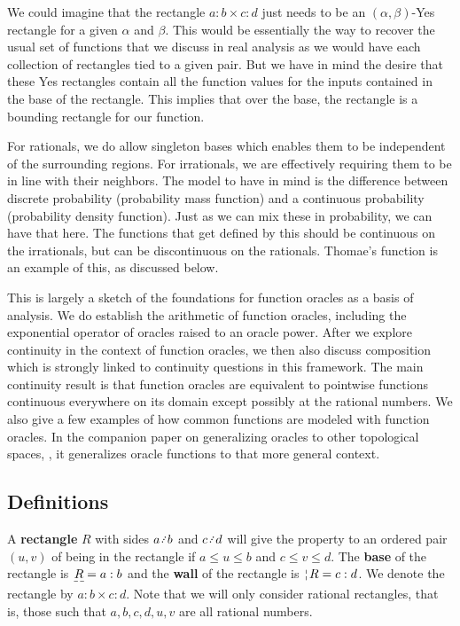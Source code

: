 \documentclass[12pt]{article}
\begin{document}
We could imagine that the rectangle $a:b \times c:d$ just needs to be an $(\alpha, \beta)$-Yes rectangle for a given $\alpha$ and $\beta$. This would be essentially the way to recover the usual set of functions that we discuss in real analysis as we would have each collection of rectangles tied to a given pair. But we have in mind the desire that these Yes rectangles contain all the function values for the inputs contained in the base of the rectangle. This implies that over the base, the rectangle is a bounding rectangle for our function. 

For rationals, we do allow singleton bases which enables them to be independent of the surrounding regions. For irrationals, we are effectively requiring them to be in line with their neighbors. The model to have in mind is the difference between discrete probability (probability mass function) and a continuous probability (probability density function). Just as we can mix these in probability, we can have that here. The functions that get defined by this should be continuous on the irrationals, but can be discontinuous on the rationals. Thomae's function is an example of this, as discussed below. 

This is largely a sketch of the foundations for function oracles as a basis of analysis. We do establish the arithmetic of function oracles, including the exponential operator of oracles raised to an oracle power. After we explore continuity in the context of function oracles, we then also discuss composition which is strongly linked to continuity questions in this framework. The main continuity result is that function oracles are equivalent to pointwise functions continuous everywhere on its domain except possibly at the rational numbers. We also give a few examples of how common functions are modeled with function oracles. In the companion paper on generalizing oracles to other topological spaces, \cite{taylor23metric}, it generalizes oracle functions to that more general context. 

\subsection{Definitions}

A \textbf{rectangle} $R$ with sides $a \lte b$ and $c \lte d$ will give the property to an ordered pair $(u, v)$ of being in the rectangle if $a \leq u \leq b$ and $c \leq v \leq d$. The \textbf{base} of the rectangle is $\base{R} = a:b$ and the \textbf{wall} of the rectangle is $\wall{R} = c:d$. We denote the rectangle by $a:b \times c:d$. Note that we will only consider rational rectangles, that is, those such that $a, b, c, d, u, v$ are all rational numbers. 
\end{document}
